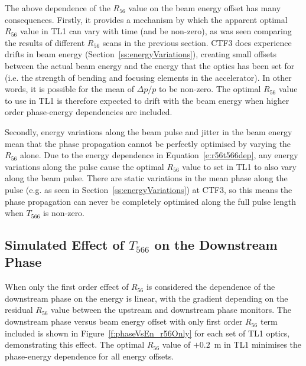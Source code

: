 The above dependence of the \(R_{56}\) value on the beam energy offset has many consequences. Firstly, it provides a mechanism by which the apparent optimal \(R_{56}\) value in TL1 can vary with time (and be non-zero), as was seen comparing the results of different \(R_{56}\) scans in the previous section. CTF3 does experience drifts in beam energy (Section~\ref{ss:energyVariations}), creating small offsets between the actual beam energy and the energy that the optics has been set for (i.e. the strength of bending and focusing elements in the accelerator). In other words, it is possible for the mean of \(\Delta p / p\) to be non-zero. The optimal \(R_{56}\) value to use in TL1 is therefore expected to drift with the beam energy when higher order phase-energy dependencies are included.

Secondly, energy variations along the beam pulse and jitter in the beam energy mean that the phase propagation cannot be perfectly optimised by varying the \(R_{56}\) alone. Due to the energy dependence in Equation~\ref{e:r56t566dep}, any energy variations along the pulse cause the optimal \(R_{56}\) value to set in TL1 to also vary along the beam pulse. There are static variations in the mean phase along the pulse (e.g. as seen in Section~\ref{ss:energyVariations}) at CTF3, so this means the phase propagation can never be completely optimised along the full pulse length when \(T_{566}\) is non-zero. 

\subsection{Simulated Effect of \(T_{566}\) on the Downstream Phase}
\label{ss:t566Sim}

When only the first order effect of \(R_{56}\) is considered the dependence of the downstream phase on the energy is linear, with the gradient depending on the residual \(R_{56}\) value between the upstream and downstream phase monitors. The downstream phase versus beam energy offset with only first order \(R_{56}\) term included is shown in Figure~\ref{f:phaseVsEn_r56Only} for each set of TL1 optics, demonstrating this effect. The optimal \(R_{56}\) value of \(+0.2\)~m in TL1 minimises the phase-energy dependence for all energy offsets.

